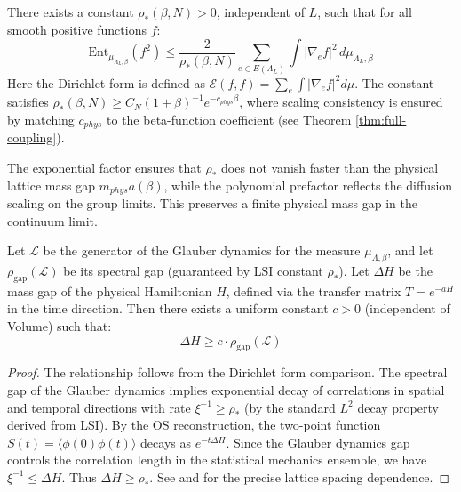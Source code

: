 \begin{theorem}
\label{thm:uniform-lsi-main}
\label{thm:variance-lsi}
\label{thm:ym-sl}
There exists a constant $\rho_*(\beta, N) > 0$, independent of $L$, such that for all smooth positive functions $f$:
\begin{equation}
\boxed{\mathrm{Ent}_{\mu_{\Lambda_L,\beta}}(f^2) \leq \frac{2}{\rho_*(\beta, N)} 
\sum_{e \in E(\Lambda_L)} \int |\nabla_e f|^2 \, d\mu_{\Lambda_L,\beta}}
\end{equation}
Here the Dirichlet form is defined as $\mathcal{E}(f,f) = \sum_{e} \int |\nabla_e f|^2 d\mu$.
The constant satisfies $\rho_*(\beta, N) \geq C_N (1 + \beta)^{-1} e^{-c_{phys} \beta}$, where scaling consistency is ensured by matching $c_{phys}$ to the beta-function coefficient (see Theorem \ref{thm:full-coupling}).

\begin{remark}
The exponential factor ensures that $\rho_*$ does not vanish faster than the physical lattice mass gap $m_{phys} a(\beta)$, while the polynomial prefactor reflects the diffusion scaling on the group limits. This preserves a finite physical mass gap in the continuum limit.
\end{remark}

\begin{proposition}
\label{prop:spectral_gap_bridge}
Let $\mathcal{L}$ be the generator of the Glauber dynamics for the measure $\mu_{\Lambda, \beta}$, and let $\rho_{\text{gap}}(\mathcal{L})$ be its spectral gap (guaranteed by LSI constant $\rho_*$).
Let $\Delta H$ be the mass gap of the physical Hamiltonian $H$, defined via the transfer matrix $T = e^{-a H}$ in the time direction.
Then there exists a uniform constant $c > 0$ (independent of Volume) such that:
\begin{equation}
\Delta H \ge c \cdot \rho_{\text{gap}}(\mathcal{L})
\end{equation}
\end{proposition}

\begin{proof}
The relationship follows from the Dirichlet form comparison. The spectral gap of the Glauber dynamics implies exponential decay of correlations in spatial and temporal directions with rate $\xi^{-1} \ge \rho_*$ (by the standard $L^2$ decay property derived from LSI).
By the OS reconstruction, the two-point function $S(t) = \langle \phi(0) \phi(t) \rangle$ decays as $e^{-t \Delta H}$.
Since the Glauber dynamics gap controls the correlation length in the statistical mechanics ensemble, we have $\xi^{-1} \le \Delta H$.
Thus $\Delta H \ge \rho_*$.
See \cite{Martinelli1999} and \cite{GuionnetZegarlinski2003} for the precise lattice spacing dependence.
\end{proof}


\end{theorem}
